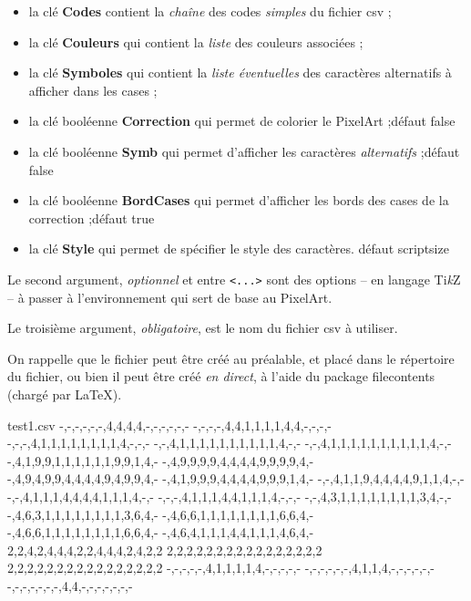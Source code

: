\documentclass{article}
\newcommand\Cle[1]{{\bfseries\sffamily\textlangle #1\textrangle}}
\begin{document}
\begin{itemize}
	\item la clé \Cle{Codes} contient la \textit{chaîne} des codes \textit{simples} du  fichier \textsf{csv} ;
	\item la clé \Cle{Couleurs} qui contient la \textit{liste} des couleurs associées ;
	\item la clé \Cle{Symboles} qui contient la \textit{liste éventuelles} des caractères alternatifs à afficher dans les cases ;
	\item la clé booléenne \Cle{Correction} qui permet de colorier le PixelArt ;\hfill{}défaut \textsf{false}
	\item la clé booléenne \Cle{Symb} qui permet d'afficher les caractères \textit{alternatifs} ;\hfill{}défaut \textsf{false}
	\item la clé booléenne \Cle{BordCases} qui permet d'afficher les bords des cases de la correction ;\hfill{}défaut \textsf{true}
	\item la clé \Cle{Style} qui permet de spécifier le style des caractères. \hfill{}défaut \textsf{scriptsize}
\end{itemize}

Le second argument, \textit{optionnel} et entre \texttt{<...>} sont des options -- en langage Ti\textit{k}Z -- à passer à l'environnement qui sert de base au PixelArt.

\medskip

Le troisième argument, \textit{obligatoire}, est le nom du fichier \textsf{csv} à utiliser.

\vspace{1cm}

On rappelle que le fichier peut être créé au préalable, et placé dans le répertoire du fichier, ou bien il peut être créé \textit{en direct}, à l'aide du package \textsf{filecontents} (chargé par \LaTeX).

\begin{PresentationCode}{}
\begin{filecontents*}[overwrite]{test1.csv}
	-,-,-,-,-,-,4,4,4,4,-,-,-,-,-,-
	-,-,-,-,4,4,1,1,1,1,4,4,-,-,-,-
	-,-,-,4,1,1,1,1,1,1,1,1,4,-,-,-
	-,-,4,1,1,1,1,1,1,1,1,1,1,4,-,-
	-,-,4,1,1,1,1,1,1,1,1,1,1,4,-,-
	-,4,1,9,9,1,1,1,1,1,1,9,9,1,4,-
	-,4,9,9,9,9,4,4,4,4,9,9,9,9,4,-
	-,4,9,4,9,9,4,4,4,4,9,4,9,9,4,-
	-,4,1,9,9,9,4,4,4,4,9,9,9,1,4,-
	-,-,4,1,1,9,4,4,4,4,9,1,1,4,-,-
	-,-,4,1,1,1,4,4,4,4,1,1,1,4,-,-
	-,-,-,4,1,1,1,4,4,1,1,1,4,-,-,-
	-,-,4,3,1,1,1,1,1,1,1,1,3,4,-,-
	-,4,6,3,1,1,1,1,1,1,1,1,3,6,4,-
	-,4,6,6,1,1,1,1,1,1,1,1,6,6,4,-
	-,4,6,6,1,1,1,1,1,1,1,1,6,6,4,-
	-,4,6,4,1,1,1,4,4,1,1,1,4,6,4,-
	2,2,4,2,4,4,4,2,2,4,4,4,2,4,2,2
	2,2,2,2,2,2,2,2,2,2,2,2,2,2,2,2
	2,2,2,2,2,2,2,2,2,2,2,2,2,2,2,2
	-,-,-,-,-,4,1,1,1,1,4,-,-,-,-,-
	-,-,-,-,-,-,4,1,1,4,-,-,-,-,-,-
	-,-,-,-,-,-,-,4,4,-,-,-,-,-,-,-
\end{filecontents*}
\end{PresentationCode}
\end{document}
